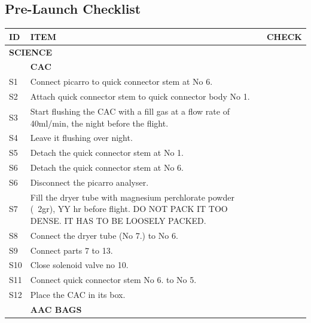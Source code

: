 \documentclass[a4paper,12pt,twoside]{article}
\providecommand{\DIFaddend}{} %
\DeclareRobustCommand{\DIFaddend}{\DIFOaddend \let\includegraphics\DIFOincludegraphics} %
\begin{document}
\begin{appendices}


\DIFaddend \newpage
\section{Pre-Launch Checklist} \label{sec:appL}





\begin{longtable} {|m{}|m{}|m{}|}
\hline
\textbf{ID} & \textbf{ITEM} & \textbf{CHECK} \\
\hline
\multicolumn{2}{|l|}{ \textbf{SCIENCE} } & \\
\hline
& \textbf{CAC} & \\
\hline
S1 & Connect picarro to quick connector stem at No 6. & \\
\hline
S2 & Attach quick connector stem to quick connector body No 1. & \\
\hline
S3 & Start flushing the CAC with a fill gas at a flow rate of 40ml/min, the night before the flight. & \\
\hline
S4 & Leave it flushing over night. & \\
\hline
S5 & Detach the quick connector stem at No 1. & \\
\hline
S6 & Detach the quick connector stem at No 6. & \\
\hline
S6 & Disconnect the picarro analyser. & \\
\hline
S7 & Fill the dryer tube with magnesium perchlorate powder (~2gr), YY hr before flight. DO NOT PACK IT TOO DENSE. IT HAS TO BE LOOSELY PACKED. & \\
\hline
S8 & Connect the dryer tube (No 7.) to No 6. & \\
\hline
S9 & Connect parts 7 to 13. & \\
\hline
S10 & Close solenoid valve no 10. & \\
\hline
S11 & Connect quick connector stem No 6. to No 5. & \\
\hline
S12 & Place the CAC in its box. & \\
\hline
& \textbf{AAC BAGS} & \\
\hline

\end{longtable}
\end{appendices}
\end{document}
